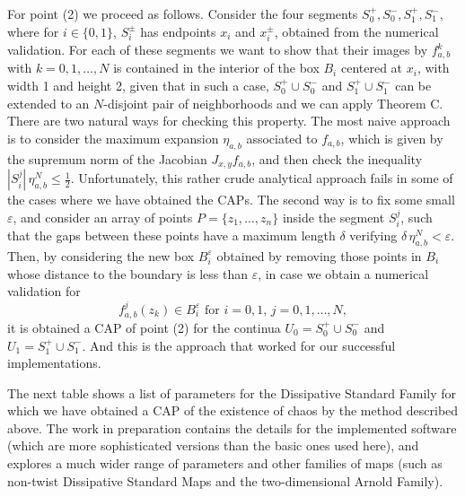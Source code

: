 \documentclass[12pt,a4paper]{amsart}
\theoremstyle{definition}
\theoremstyle{remark}
\begin{document}
For point (2) %
we proceed as follows. Consider the four segments $S^+_0,S^-_0,S^+_1,S^-_1,$ where for $i\in\{0,1\}$, $S^{\pm}_i$ has endpoints $x_i$ and  $x_i^{\pm}$, obtained from the numerical validation. For each of these segments
we want to show that their images by $f_{a,b}^k$ with $k=0,1,\ldots,N$ is contained in the interior of the box $B_i$ centered at $x_i$, with width 1 and height 2, given that in such a case,
$S_0^+\cup S_0^-$ and $S_1^+\cup S_1^-$ can be extended to an $N$-disjoint pair of neighborhoods and we can
apply Theorem C.
There are two natural ways for checking this property. The most naive approach is to consider the maximum expansion $\eta_{a,b}$ associated to $f_{a,b}$, which is given by the supremum norm of the Jacobian $J_{x,y}f_{a,b}$, and then check the inequality $|S^j_i| \,\eta_{a,b}^N\leq \frac{1}{2}$. Unfortunately, this rather crude analytical approach
fails in some of the cases where we have obtained the CAPs.  The second way is to fix some small $\varepsilon$,
and consider an array of points $P=\{z_1,\ldots ,z_n \}$ inside the segment $S^j_i$, such that the gaps
between these points have a maximum length $\delta$ verifying $\delta\,\eta_{a,b}^N<\varepsilon$.
Then, by considering the new box $B_i^{\varepsilon}$ obtained by removing those points in $B_i$ whose distance to the boundary is less than  $\varepsilon$, in case we obtain a numerical validation for 
$$f_{a,b}^j(z_k)\in B_i^{\varepsilon}\mbox{ for }i=0,1,\,j=0,1,\dots,N,$$
it is obtained a CAP of point (2) for the continua $U_0=S_0^+\cup S_0^-$ and $U_1=S_1^+\cup S_1^-$. And this is the
approach that worked for our successful implementations.

\smallskip

The next table shows a list of parameters for the  Dissipative Standard Family for which we have obtained a CAP of the existence of chaos by the method described above. The work in preparation \cite{theoappandnumer} contains the details for the implemented software (which are more sophisticated versions than the basic ones used here), and explores
a much wider range of parameters and other families of maps (such
as non-twist Dissipative Standard Maps and the two-dimensional Arnold Family). %
\end{document}
